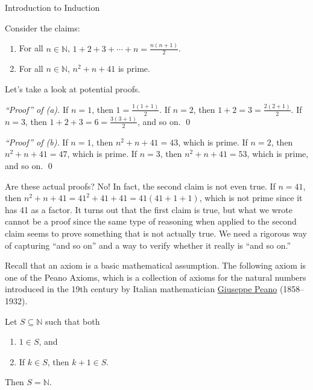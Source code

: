 \begin{section}{Introduction to Induction}\label{sec:Intro_to_Induction}

Consider the claims:
\begin{enumerate}[label=\textrm{(\alph*)}]
\item For all $n\in\mathbb{N}$, $\displaystyle 1+2+3+\cdots +n=\frac{n(n+1)}{2}$.
\item For all $n\in\mathbb{N}$, $n^{2}+n+41$ is prime.
\end{enumerate}
Let's take a look at potential proofs.

\bigskip

\noindent \emph{``Proof'' of (a).} If $n=1$, then $1=\frac{1(1+1)}{2}$.  If $n=2$, then $1+2=3=\frac{2(2+1)}{2}$.  If $n=3$, then $1+2+3=6=\frac{3(3+1)}{2}$, and so on. \hfill \qed

\bigskip

\noindent \emph{``Proof'' of (b).} If $n=1$, then $n^{2}+n+41=43$, which is prime.  If $n=2$, then $n^{2}+n+41=47$, which is prime.  If $n=3$, then $n^{2}+n+41=53$, which is prime, and so on. \hfill \qed

\bigskip

Are these actual proofs?  No!  In fact, the second claim is not even true.  If $n=41$, then $n^{2}+n+41=41^{2}+41+41=41(41+1+1)$, which is not prime since it has 41 as a factor.  It turns out that the first claim is true, but what we wrote cannot be a proof since the same type of reasoning when applied to the second claim seems to prove something that is not actually true.  We need a rigorous way of capturing ``and so on'' and a way to verify whether it really is ``and so on.''

Recall that an axiom is a basic mathematical assumption.  The following axiom is one of the Peano Axioms, which is a collection of axioms for the natural numbers introduced in the 19th century by Italian mathematician \href{https://en.wikipedia.org/wiki/Giuseppe_Peano}{Giuseppe Peano} (1858--1932).

\begin{axiom}\label{axiom:induction}
Let $S\subseteq \mathbb{N}$ such that both
\begin{enumerate}[label=\textrm{(\roman*)}]
\item $1\in S$, and
\item If $k\in S$, then $k+1\in S$.
\end{enumerate}
Then $S=\mathbb{N}$.
\end{axiom}


\end{section}
